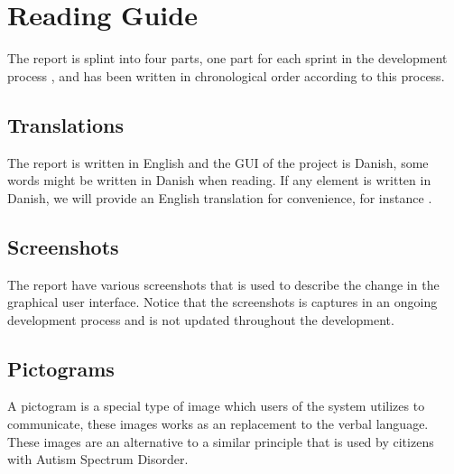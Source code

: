 
\section*{Reading Guide}
The report is splint into four parts, one part for each sprint in the development process \parencite{scrum}, and has been written in chronological order according to this process. 

\subsection*{Translations}
\label{sub:translations}
The report is written in English and the GUI of the project is Danish, some words might be written in Danish when reading. If any element is written in Danish, we will provide an English translation for convenience, for instance .

\subsection*{Screenshots}
The report have various screenshots that is used to describe the change in the graphical user interface. Notice that the screenshots is captures in an ongoing development process and is not updated throughout the development.

\subsection*{Pictograms}
A pictogram is a special type of image which users of the \giraf system utilizes to communicate, these images works as an replacement to the verbal language. These images are an alternative to a similar principle that is used by citizens with Autism Spectrum Disorder.  
